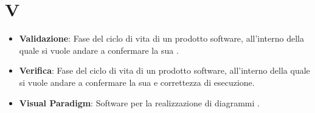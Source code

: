 \section{V}
\begin{itemize}
	\item
	\textbf{Validazione}: Fase del ciclo di vita di un prodotto software, all'interno della quale si vuole andare a confermare la sua .
	\item
	\textbf{Verifica}: Fase del ciclo di vita di un prodotto software, all'interno della quale si vuole andare a confermare la sua  e correttezza di esecuzione.
	\item
	\textbf{Visual Paradigm}: Software per la realizzazione di diagrammi .
\end{itemize}
\newpage
